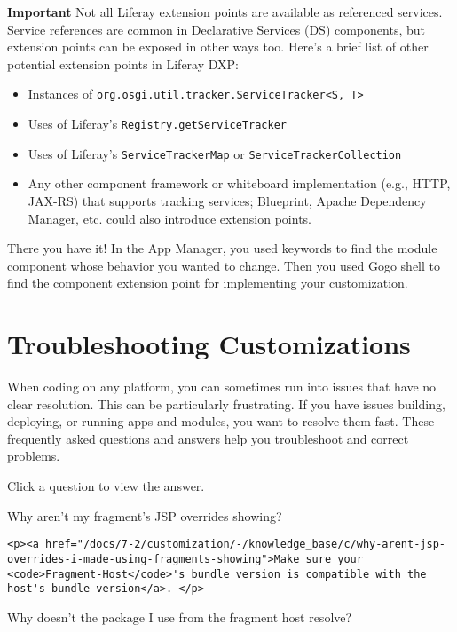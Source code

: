 \textbf{Important} Not all Liferay extension points are available as
referenced services. Service references are common in Declarative
Services (DS) components, but extension points can be exposed in other
ways too. Here's a brief list of other potential extension points in
Liferay DXP:

\begin{itemize}
\tightlist
\item
  Instances of
  \texttt{org.osgi.util.tracker.ServiceTracker\textless{}S,\ T\textgreater{}}
\item
  Uses of Liferay's \texttt{Registry.getServiceTracker}
\item
  Uses of Liferay's \texttt{ServiceTrackerMap} or
  \texttt{ServiceTrackerCollection}
\item
  Any other component framework or whiteboard implementation (e.g.,
  HTTP, JAX-RS) that supports tracking services; Blueprint, Apache
  Dependency Manager, etc. could also introduce extension points.
\end{itemize}

There you have it! In the App Manager, you used keywords to find the
module component whose behavior you wanted to change. Then you used Gogo
shell to find the component extension point for implementing your
customization.

\chapter{Troubleshooting
Customizations}\label{troubleshooting-customizations}

When coding on any platform, you can sometimes run into issues that have
no clear resolution. This can be particularly frustrating. If you have
issues building, deploying, or running apps and modules, you want to
resolve them fast. These frequently asked questions and answers help you
troubleshoot and correct problems.

Click a question to view the answer.

{Why aren't my fragment's JSP overrides showing?~{}}

\begin{verbatim}
<p><a href="/docs/7-2/customization/-/knowledge_base/c/why-arent-jsp-overrides-i-made-using-fragments-showing">Make sure your <code>Fragment-Host</code>'s bundle version is compatible with the host's bundle version</a>. </p>
\end{verbatim}

{Why doesn't the package I use from the fragment host resolve?~{}}

